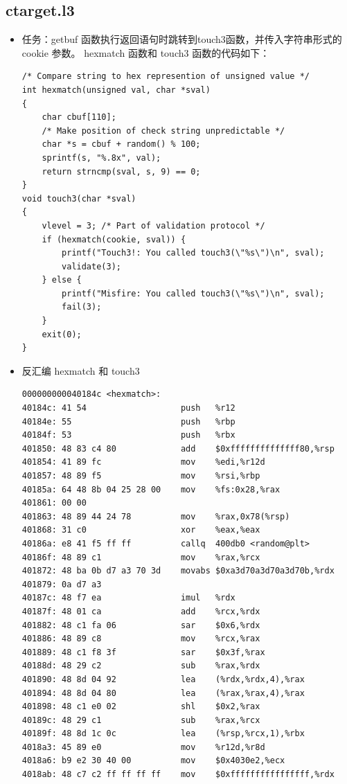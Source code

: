 \documentclass[12pt, a4paper, oneside]{ctexart}
\begin{document}
\subsection{ctarget.l3}
\begin{itemize}
    \item 任务：getbuf 函数执行返回语句时跳转到touch3函数，并传入字符串形式的 cookie 参数。
    hexmatch 函数和 touch3 函数的代码如下：
\begin{lstlisting}
/* Compare string to hex represention of unsigned value */
int hexmatch(unsigned val, char *sval)
{
    char cbuf[110];
    /* Make position of check string unpredictable */
    char *s = cbuf + random() % 100;
    sprintf(s, "%.8x", val);
    return strncmp(sval, s, 9) == 0;
}
void touch3(char *sval)
{
    vlevel = 3; /* Part of validation protocol */
    if (hexmatch(cookie, sval)) {
        printf("Touch3!: You called touch3(\"%s\")\n", sval);
        validate(3);
    } else {
        printf("Misfire: You called touch3(\"%s\")\n", sval);
        fail(3);
    }
    exit(0);
}
\end{lstlisting}
    \item 反汇编 hexmatch 和 touch3
\begin{lstlisting}
000000000040184c <hexmatch>:
40184c:	41 54                	push   %r12
40184e:	55                   	push   %rbp
40184f:	53                   	push   %rbx
401850:	48 83 c4 80          	add    $0xffffffffffffff80,%rsp
401854:	41 89 fc             	mov    %edi,%r12d
401857:	48 89 f5             	mov    %rsi,%rbp
40185a:	64 48 8b 04 25 28 00 	mov    %fs:0x28,%rax
401861:	00 00 
401863:	48 89 44 24 78       	mov    %rax,0x78(%rsp)
401868:	31 c0                	xor    %eax,%eax
40186a:	e8 41 f5 ff ff       	callq  400db0 <random@plt>
40186f:	48 89 c1             	mov    %rax,%rcx
401872:	48 ba 0b d7 a3 70 3d 	movabs $0xa3d70a3d70a3d70b,%rdx
401879:	0a d7 a3 
40187c:	48 f7 ea             	imul   %rdx
40187f:	48 01 ca             	add    %rcx,%rdx
401882:	48 c1 fa 06          	sar    $0x6,%rdx
401886:	48 89 c8             	mov    %rcx,%rax
401889:	48 c1 f8 3f          	sar    $0x3f,%rax
40188d:	48 29 c2             	sub    %rax,%rdx
401890:	48 8d 04 92          	lea    (%rdx,%rdx,4),%rax
401894:	48 8d 04 80          	lea    (%rax,%rax,4),%rax
401898:	48 c1 e0 02          	shl    $0x2,%rax
40189c:	48 29 c1             	sub    %rax,%rcx
40189f:	48 8d 1c 0c          	lea    (%rsp,%rcx,1),%rbx
4018a3:	45 89 e0             	mov    %r12d,%r8d
4018a6:	b9 e2 30 40 00       	mov    $0x4030e2,%ecx
4018ab:	48 c7 c2 ff ff ff ff 	mov    $0xffffffffffffffff,%rdx

\end{lstlisting}
\end{itemize}
\end{document}
